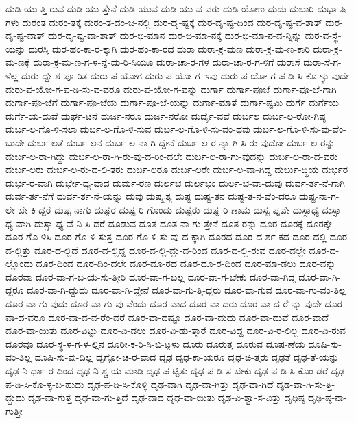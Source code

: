 {ದುಡಿ-ಯು-ತ್ತಿ-ರುವ
ದುಡಿ-ಯು-ತ್ತೇನೆ
ದುಡಿ-ಯುವ
ದುಡಿ-ಯು-ವ-ವರು
ದುಡಿ-ಯೋಣ
ದುದು
ದುಬಾರಿ
ದುಭಾ-ಷಿ-ಗಳು
ದುರಂತ
ದುರಂ-ತಕ್ಕೆ
ದುರಂ-ತ-ದಂ-ಚಿ-ನಲ್ಲಿ
ದುರ-ದೃ-ಷ್ಟಕ್ಕೆ
ದುರ-ದೃ-ಷ್ಟ-ದಿಂದ
ದುರ-ದೃ-ಷ್ಟ-ವ-ಶಾತ್
ದುರ-ದೃ-ಷ್ಟ-ವಾತ್
ದುರ-ದೃ-ಷ್ಟ-ವಾ-ಶಾತ್
ದುರ-ಭಿ-ಮಾನ
ದುರ-ಭಿ-ಮಾ-ನಕ್ಕೆ
ದುರ-ಭಿ-ಮಾ-ನ-ವ-ನ್ನಿನ್ನು
ದುರ-ವ-ಸ್ಥೆ-ಯನ್ನು
ದುರಸ್ತಿ
ದುರ-ಹಂ-ಕಾ-ರ-ಕ್ಕಾಗಿ
ದುರ-ಹಂ-ಕಾ-ರದ
ದುರಾ
ದುರಾ-ಕ್ರ-ಮಣ
ದುರಾ-ಕ್ರ-ಮ-ಣ-ಕಾರಿ
ದುರಾ-ಕ್ರ-ಮ-ಣಕ್ಕೆ
ದುರಾ-ಕ್ರ-ಮ-ಣ-ಗ-ಳ-ನ್ನೆ-ದು-ರಿ-ಸಿಯೂ
ದುರಾ-ಚಾ-ರ-ಗಳ
ದುರಾ-ಚಾ-ರ-ಗ-ಳಿಗೆ
ದುರಾಸೆ
ದುರಾ-ಸೆ-ಗ-ಳೆಲ್ಲ
ದುರು-ದ್ದೇ-ಶ-ಪೂ-ರಿತ
ದುರು-ಪ-ಯೋಗ
ದುರು-ಪ-ಯೋ-ಗ-ಇವು
ದುರು-ಪ-ಯೋ-ಗ-ಪ-ಡಿ-ಸಿ-ಕೊ-ಳ್ಳು-ವುದೇ
ದುರು-ಪ-ಯೋ-ಗ-ಪ-ಡಿ-ಸು-ವ-ವರೂ
ದುರು-ಪ-ಯೋ-ಗ-ವನ್ನು
ದುರ್ಗಾ
ದುರ್ಗಾ-ಪೂಜೆ
ದುರ್ಗಾ-ಪೂ-ಜೆ-ಗಾಗಿ
ದುರ್ಗಾ-ಪೂ-ಜೆಗೆ
ದುರ್ಗಾ-ಪೂ-ಜೆಯ
ದುರ್ಗಾ-ಪೂ-ಜೆ-ಯನ್ನು
ದುರ್ಗಾ-ಮಾತೆ
ದುರ್ಗಾ-ಷ್ಟಮಿ
ದುರ್ಗೆ
ದುರ್ಗೆಯ
ದುರ್ಗೆ-ಯ-ದುವೆ
ದುರ್ಘ-ಟನೆ
ದುರ್ಜ-ನರೂ
ದುರ್ಜ-ನರೋ
ದುರ್ದೈ-ವವೆ
ದುರ್ಬಲ
ದುರ್ಬ-ಲ-ರೋ-ಗಿಷ್ಠ
ದುರ್ಬ-ಲ-ಗೊ-ಳಿ-ಸಲಾ
ದುರ್ಬ-ಲ-ಗೊ-ಳಿ-ಸುವ
ದುರ್ಬ-ಲ-ಗೊ-ಳಿ-ಸು-ವಂ-ಥವು
ದುರ್ಬ-ಲ-ಗೊ-ಳಿ-ಸು-ವು-ವೆಂ-ಬುದೇ
ದುರ್ಬ-ಲತೆ
ದುರ್ಬ-ಲನ
ದುರ್ಬ-ಲ-ನಾ-ಗಿ-ದ್ದೇನೆ
ದುರ್ಬ-ಲ-ರ-ನ್ನಾ-ಗಿ-ಸಿ-ರು-ವುದೋ
ದುರ್ಬ-ಲ-ರನ್ನು
ದುರ್ಬ-ಲ-ರಾ-ಗಿದ್ದು
ದುರ್ಬ-ಲ-ರಾ-ಗಿ-ರು-ವು-ದ-ರಿಂ-ದಲೇ
ದುರ್ಬ-ಲ-ರಾ-ಗು-ವುದನ್ನು
ದುರ್ಬ-ಲ-ರಾ-ದ-ವರು
ದುರ್ಬ-ಲರು
ದುರ್ಬ-ಲ-ರು-ದ-ಲಿ-ತರು
ದುರ್ಬ-ಲರೂ
ದುರ್ಬ-ಲರೇ
ದುರ್ಬ-ಲ-ವಾ-ಗಿದ್ದ
ದುರ್ಬು-ದ್ಧಿಯ
ದುರ್ಭರ
ದುರ್ಭ-ರ-ವಾಗಿ
ದುರ್ಭೇ-ದ್ಯ-ವಾದ
ದುರ್ಮ-ರಣ
ದುರ್ಲಭ
ದುರ್ಲಭಂ
ದುರ್ಲ-ಭ-ವಾ-ದುವು
ದುರ್ವ-ರ್ತ-ನೆ-ಗಾಗಿ
ದುರ್ವ-ರ್ತ-ನೆಗೆ
ದುರ್ವ-ರ್ತ-ನೆ-ಯನ್ನು
ದುವು
ದುಷ್ಕೃತ್ಯ
ದುಷ್ಟ
ದುಷ್ಟ-ತನ
ದುಷ್ಟ-ತ-ನ-ವೆಂ-ದರೂ
ದುಷ್ಟ-ನಾ-ಗ-ಲೇ-ಬೇ-ಕಿ-ದ್ದರೆ
ದುಷ್ಟ-ನಾಗು
ದುಷ್ಟರ
ದುಷ್ಟ-ರಿ-ಗೊಂದು
ದುಷ್ಟರು
ದುಷ್ಪ-ರಿ-ಣಾಮ
ದುಸ್ವ-ಪ್ನವೇ
ದುಸ್ಸಾಧ್ಯ
ದುಸ್ಸಾ-ಧ್ಯ-ವಾಗಿ
ದುಸ್ಸಾ-ಧ್ಯ-ವೆ-ನಿ-ಸಿ-ದರೆ
ದೂಡುವ
ದೂತ
ದೂತ-ನಾ-ಗು-ತ್ತೇನೆ
ದೂತ-ರನ್ನು
ದೂರ
ದೂರಕ್ಕೆ
ದೂರಕ್ಕೇ
ದೂರ-ಗೊ-ಳಿಸಿ
ದೂರ-ಗೊ-ಳಿ-ಸುತ್ತ
ದೂರ-ಗೊ-ಳಿ-ಸು-ವು-ದ-ಕ್ಕಾಗಿ
ದೂರದ
ದೂರ-ದ-ರ್ಶ-ಕದ
ದೂರ-ದಲ್ಲಿ
ದೂರ-ದ-ಲ್ಲಿತ್ತು
ದೂರ-ದ-ಲ್ಲಿದೆ
ದೂರ-ದ-ಲ್ಲಿದ್ದ
ದೂರ-ದ-ಲ್ಲಿ-ದ್ದು-ದ-ರಿಂದ
ದೂರ-ದ-ಲ್ಲಿ-ರುವ
ದೂರ-ದಲ್ಲೇ
ದೂರ-ದ-ಲ್ಲೊಂದು
ದೂರ-ದಿಂದ
ದೂರ-ದಿಂ-ದಲೇ
ದೂರ-ದೂ-ರದ
ದೂರ-ದೂ-ರ-ದಿಂದ
ದೂರ-ಮಾ-ಡಲು
ದೂರ-ವನ್ನು
ದೂರವಾ
ದೂರ-ವಾ-ಗ-ಬ-ಯ-ಸು-ತ್ತೀರಿ
ದೂರ-ವಾ-ಗ-ಬಲ್ಲ
ದೂರ-ವಾ-ಗ-ಬೇಕು
ದೂರ-ವಾ-ಗಿದ್ದ
ದೂರ-ವಾ-ಗಿ-ದ್ದರೂ
ದೂರ-ವಾ-ಗಿ-ದ್ದುದು
ದೂರ-ವಾ-ಗಿ-ದ್ದೇನೆ
ದೂರ-ವಾ-ಗು-ತ್ತಿ-ದ್ದರು
ದೂರ-ವಾ-ಗುವ
ದೂರ-ವಾ-ಗು-ವಂ-ತಿಲ್ಲ
ದೂರ-ವಾ-ಗು-ವುದು
ದೂರ-ವಾ-ಗು-ವು-ವೆಂದು
ದೂರ-ವಾದ
ದೂರ-ವಾ-ದರು
ದೂರ-ವಾ-ದ-ರೆ-ನ್ನು-ವುದೇ
ದೂರ-ವಾ-ದ-ವರೂ
ದೂರ-ವಾ-ದ-ವ-ರೆಂ-ದರೆ
ದೂರ-ವಾ-ದಷ್ಟೂ
ದೂರ-ವಾ-ದುದು
ದೂರ-ವಾ-ದುವೆ
ದೂರ-ವಾದೆ
ದೂರ-ವಾ-ಯಿತು
ದೂರ-ವಿಟ್ಟು
ದೂರ-ವಿ-ಡಲು
ದೂರ-ವಿ-ಡು-ತ್ತಾರೆ
ದೂರ-ವಿದ್ದ
ದೂರ-ವಿ-ರ-ಲಿಲ್ಲ
ದೂರ-ವಿ-ರುವ
ದೂರವೂ
ದೂರ-ಸ್ಥ-ಳ-ಗ-ಳ-ಲ್ಲಿನ
ದೂರೀ-ಕ-ರಿ-ಸಿ-ಬಿ-ಟ್ಟಳು
ದೂರು
ದೂರುತ್ತ
ದೂರುವ
ದೂಷ-ಣೆಯ
ದೂಷಿ-ಸು-ವಂ-ತಿಲ್ಲ
ದೂಷಿ-ಸು-ವು-ದಿಲ್ಲ
ದೃಗ್ಗೋ-ಚ-ರ-ವಾದ
ದೃಢ
ದೃಢ-ಕಾ-ಯರೂ
ದೃಢ-ಚಿ-ತ್ತರು
ದೃಢತೆ
ದೃಢ-ತೆ-ಯನ್ನು
ದೃಢ-ನಿ-ರ್ಧಾ-ರ-ದಿಂದ
ದೃಢ-ನಿ-ಶ್ಚ-ಯ-ಮಾಡಿ
ದೃಢ-ಪ-ಟ್ಟಿತು
ದೃಢ-ಪ-ಡಿ-ಸ-ಬೇಕು
ದೃಢ-ಪ-ಡಿ-ಸಿ-ಕೊಂ-ಡರೆ
ದೃಢ-ಪ-ಡಿ-ಸಿ-ಕೊ-ಳ್ಳ-ಬ-ಹುದು
ದೃಢ-ಪ-ಡಿ-ಸಿ-ಕೊಳ್ಳಿ
ದೃಢ-ವಾಗಿ
ದೃಢ-ವಾ-ಗಿತ್ತು
ದೃಢ-ವಾ-ಗಿದೆ
ದೃಢ-ವಾ-ಗಿ-ಸು-ತ್ತಿ-ದ್ದುದು
ದೃಢ-ವಾ-ಗುತ್ತ
ದೃಢ-ವಾ-ಗು-ತ್ತಿದೆ
ದೃಢ-ವಾದ
ದೃಢ-ವಾ-ಯಿತು
ದೃಢ-ವಿ-ಶ್ವಾ-ಸ-ವಿತ್ತು
ದೃಢಿಷ್ಠ
ದೃಢಿ-ಷ್ಠ-ನಾ-ಗುತ್ತೀ
}

